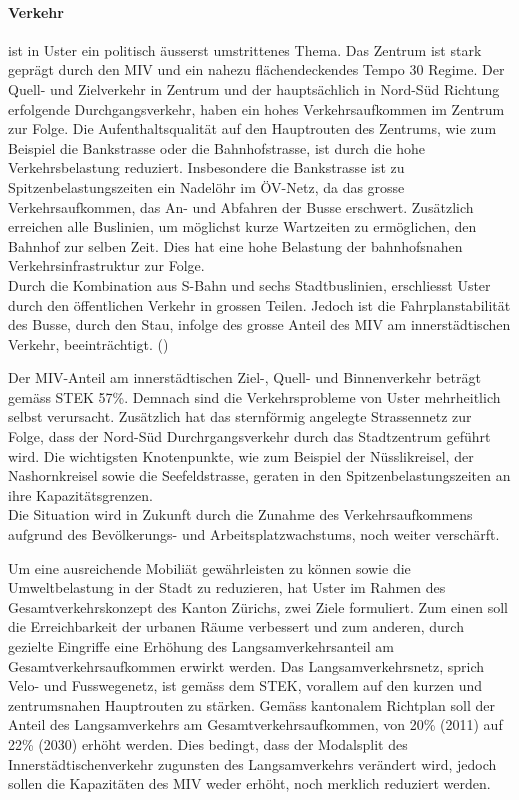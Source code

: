 \paragraph{Verkehr} ist in Uster ein politisch äusserst umstrittenes Thema. Das Zentrum ist stark geprägt durch den MIV und ein nahezu flächendeckendes Tempo 30 Regime. Der Quell- und Zielverkehr in Zentrum und der hauptsächlich in Nord-Süd Richtung erfolgende Durchgangsverkehr, haben ein hohes Verkehrsaufkommen im Zentrum zur Folge. Die Aufenthaltsqualität auf den Hauptrouten des Zentrums, wie zum Beispiel die Bankstrasse oder die Bahnhofstrasse, ist durch die hohe Verkehrsbelastung reduziert. Insbesondere die Bankstrasse ist zu Spitzenbelastungszeiten ein Nadelöhr im ÖV-Netz, da das grosse Verkehrsaufkommen, das An- und Abfahren der Busse erschwert. Zusätzlich erreichen alle Buslinien, um möglichst kurze Wartzeiten zu ermöglichen, den Bahnhof zur selben Zeit. Dies hat eine hohe Belastung der bahnhofsnahen Verkehrsinfrastruktur zur Folge. \\
Durch die Kombination aus S-Bahn und sechs Stadtbuslinien, erschliesst Uster durch den öffentlichen Verkehr in grossen Teilen. Jedoch ist die Fahrplanstabilität des Busse, durch den Stau, infolge des grosse Anteil des MIV am innerstädtischen Verkehr, beeinträchtigt. (\cite{STEK})

Der MIV-Anteil am innerstädtischen Ziel-, Quell- und Binnenverkehr beträgt gemäss STEK 57\%. Demnach sind die Verkehrsprobleme von Uster mehrheitlich selbst verursacht. Zusätzlich hat das sternförmig angelegte Strassennetz zur Folge, dass der Nord-Süd Durchrgangsverkehr durch das Stadtzentrum geführt wird. Die wichtigsten Knotenpunkte, wie zum Beispiel der Nüsslikreisel, der Nashornkreisel sowie die Seefeldstrasse, geraten in den Spitzenbelastungszeiten an ihre Kapazitätsgrenzen. \\
Die Situation wird in Zukunft durch die Zunahme des Verkehrsaufkommens aufgrund des Bevölkerungs- und Arbeitsplatzwachstums, noch weiter verschärft. 

Um eine ausreichende Mobiliät gewährleisten zu können sowie die Umweltbelastung in der Stadt zu reduzieren, hat Uster im Rahmen des Gesamtverkehrskonzept des Kanton Zürichs, zwei Ziele formuliert. Zum einen soll die Erreichbarkeit der urbanen Räume verbessert und zum anderen, durch gezielte Eingriffe eine Erhöhung des Langsamverkehrsanteil am Gesamtverkehrsaufkommen erwirkt werden. Das Langsamverkehrsnetz, sprich Velo- und Fusswegenetz, ist gemäss dem STEK, vorallem auf den kurzen und zentrumsnahen Hauptrouten zu stärken. Gemäss kantonalem Richtplan soll der Anteil des Langsamverkehrs am Gesamtverkehrsaufkommen, von 20\% (2011) auf 22\% (2030) erhöht werden. Dies bedingt, dass der Modalsplit des Innerstädtischenverkehr zugunsten des Langsamverkehrs verändert wird, jedoch sollen die Kapazitäten des MIV weder erhöht, noch merklich reduziert werden. 

